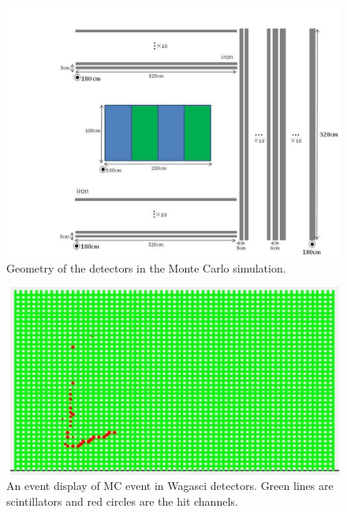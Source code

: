 \begin{figure}[tbh]
\begin{center}
\includegraphics[width=0.8\linewidth]{fig/wagasci_mc_geometry.pdf}
\end{center}
\caption{
Geometry of the detectors in the Monte Carlo simulation.}
\label{fig:wagasci_mc_geometry}
\end{figure}

\begin{figure}[tbh]
\begin{center}
\includegraphics[width=0.8\linewidth]{fig/wagasci_event_display.pdf}
\end{center}
\caption{
An event display of MC event in Wagasci detectors. Green lines are scintillators and red circles are the hit channels.}
\label{fig:wagasci_mc_geometry}
\end{figure}



